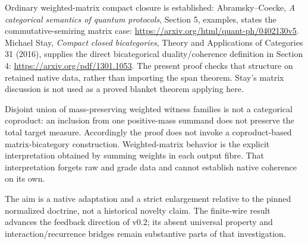 \documentclass{article}
\begin{document}
Ordinary weighted-matrix compact closure is established: Abramsky--Coecke, \emph{A categorical semantics of quantum protocols}, Section 5, examples, states the commutative-semiring matrix case: \url{https://arxiv.org/html/quant-ph/0402130v5}. Michael Stay, \emph{Compact closed bicategories}, Theory and Applications of Categories 31 (2016), supplies the direct bicategorical duality/coherence definition in Section 4: \url{https://arxiv.org/pdf/1301.1053}. The present proof checks that structure on retained native data, rather than importing the span theorem. Stay's matrix discussion is not used as a proved blanket theorem applying here.

Disjoint union of mass-preserving weighted witness families is not a categorical coproduct: an inclusion from one positive-mass summand does not preserve the total target measure. Accordingly the proof does not invoke a coproduct-based matrix-bicategory construction. Weighted-matrix behavior is the explicit interpretation obtained by summing weights in each output fibre. That interpretation forgets raw and grade data and cannot establish native coherence on its own.

The aim is a native adaptation and a strict enlargement relative to the pinned normalized doctrine, not a historical novelty claim. The finite-wire result advances the feedback direction of v0.2; its absent universal property and interaction/recurrence bridges remain substantive parts of that investigation.
\end{document}
